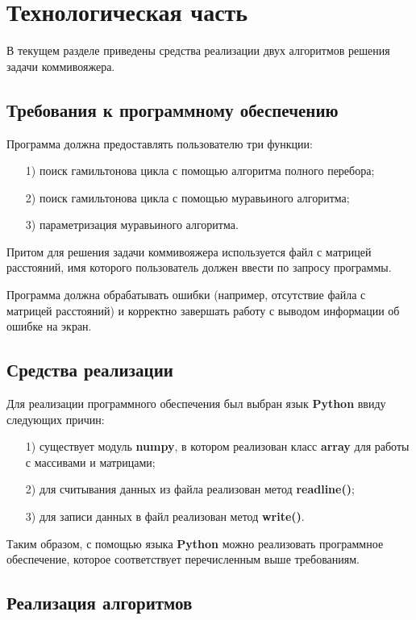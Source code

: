 \chapter{Технологическая часть}

В текущем разделе приведены средства реализации двух алгоритмов решения задачи коммивояжера.

\section{Требования к программному обеспечению}

Программа должна предоставлять пользователю три функции:
\begin{enumerate}
\item[1)] поиск гамильтонова цикла с помощью алгоритма полного перебора;
\item[2)] поиск гамильтонова цикла с помощью муравьиного алгоритма;
\item[3)] параметризация муравьиного алгоритма.
\end{enumerate}

Притом для решения задачи коммивояжера используется файл с матрицей расстояний, имя которого пользователь должен ввести по запросу программы.

Программа должна обрабатывать ошибки (например, отсутствие файла с матрицей расстояний) и корректно завершать работу с выводом информации об ошибке на экран.
 
\section{Средства реализации}

Для реализации программного обеспечения был выбран язык \textbf{Python} ввиду следующих причин:
\begin{enumerate}
\item[1)] существует модуль \textbf{numpy}, в котором реализован класс \textbf{array} для работы с массивами и матрицами;
\item[2)] для считывания данных из файла реализован метод \textbf{readline()};
\item[3)] для записи данных в файл реализован метод \textbf{write()}.
\end{enumerate}

Таким образом, с помощью языка \textbf{Python} можно реализовать программное обеспечение, которое соответствует перечисленным выше требованиям.

\section{Реализация алгоритмов}

